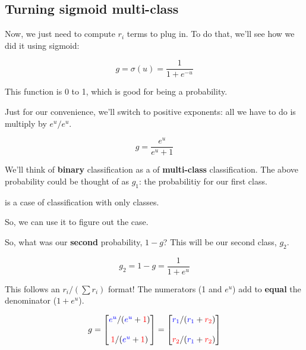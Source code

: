    \subsection{Turning sigmoid multi-class}
    
        Now, we just need to compute $r_i$ terms to plug in. To do that, we'll see how we did it using sigmoid:
        
        \begin{equation}
            g= \sigma(u) = \frac{1}{1+e^{-u}}
        \end{equation}
        
        This function is 0 to 1, which is good for being a probability. 
        
        Just for our convenience, we'll switch to positive exponents: all we have to do is multiply by $e^u/e^u$.
        
        \begin{equation}
            g = \frac{e^u}{e^u+1}
        \end{equation}
        
        We'll think of \textbf{binary} classification as a  of \textbf{multi-class} classification. The above probability could be thought of as $g_1$: the probabilitiy for our first class.\\
        
        \begin{concept}
             is a  case of  classification with only  classes. 
            
            So, we can use it to figure out the  case.
        \end{concept}
        
        So, what was our \textbf{second} probability, $1-g$? This will be our second class, $g_2$.
        
        \begin{equation}
            g_2 = 1-g= \frac{1}{1+e^{u}}
        \end{equation}
        
        This follows an $r_i/(\sum r_i)$ format! The numerators (1 and $e^u$) add to \textbf{equal} the denominator ($1+e^u$).
        
        \begin{equation}
            g = 
            \begin{bmatrix}
                \textcolor{blue}{e^u}/(\textcolor{blue}{e^u}+\textcolor{red}{1})  \\\\
                \textcolor{red}{1}/(\textcolor{blue}{e^u}+\textcolor{red}{1})  
            \end{bmatrix}
            =
            \begin{bmatrix}
                \textcolor{blue}{r_1} / (\textcolor{blue}{r_1}+\textcolor{red}{r_2}) \\\\
                \textcolor{red}{r_2} / (\textcolor{blue}{r_1}+\textcolor{red}{r_2})
            \end{bmatrix}
        \end{equation}
        
